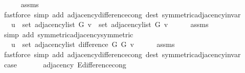 \begin{isabellebody}
\ \ \ \ \isamarkupfalse%
\ assms\isanewline
\ \ \ \ \isamarkupfalse%
\ {\isacharparenleft}{\kern0pt}fastforce\ simp\ add{\isacharcolon}{\kern0pt}\ adjacency{\isacharunderscore}{\kern0pt}difference{\isacharunderscore}{\kern0pt}cong\ dest{\isacharcolon}{\kern0pt}\ symmetric{\isacharunderscore}{\kern0pt}adjacency{\isachardot}{\kern0pt}invar{\isacharparenright}{\kern0pt}\isanewline
\ \ \isamarkupfalse%
\ \isamarkupfalse%
\ {\isachardoublequoteopen}{\isachardot}{\kern0pt}{\isachardot}{\kern0pt}{\isachardot}{\kern0pt}\ {\isasymlongleftrightarrow}\ u\ {\isasymin}\ set\ {\isacharparenleft}{\kern0pt}adjacency{\isacharunderscore}{\kern0pt}list\ G{}\ v{\isacharparenright}{\kern0pt}\ {\isacharminus}{\kern0pt}\ set\ {\isacharparenleft}{\kern0pt}adjacency{\isacharunderscore}{\kern0pt}list\ G{}\ v{\isacharparenright}{\kern0pt}{\isachardoublequoteclose}\isanewline
\ \ \ \ \isamarkupfalse%
\ assms\isanewline
\ \ \ \ \isamarkupfalse%
\ {\isacharparenleft}{\kern0pt}simp\ add{\isacharcolon}{\kern0pt}\ symmetric{\isacharunderscore}{\kern0pt}adjacency{\isachardot}{\kern0pt}symmetric{\isacharparenright}{\kern0pt}\isanewline
\ \ \isamarkupfalse%
\ \isamarkupfalse%
\ {\isachardoublequoteopen}{\isachardot}{\kern0pt}{\isachardot}{\kern0pt}{\isachardot}{\kern0pt}\ {\isasymlongleftrightarrow}\ u\ {\isasymin}\ set\ {\isacharparenleft}{\kern0pt}adjacency{\isacharunderscore}{\kern0pt}list\ {\isacharparenleft}{\kern0pt}difference\ G{}\ G{}{\isacharparenright}{\kern0pt}\ v{\isacharparenright}{\kern0pt}{\isachardoublequoteclose}\isanewline
\ \ \ \ \isamarkupfalse%
\ assms\isanewline
\ \ \ \ \isamarkupfalse%
\ {\isacharparenleft}{\kern0pt}fastforce\ simp\ add{\isacharcolon}{\kern0pt}\ adjacency{\isacharunderscore}{\kern0pt}difference{\isacharunderscore}{\kern0pt}cong\ dest{\isacharcolon}{\kern0pt}\ symmetric{\isacharunderscore}{\kern0pt}adjacency{\isachardot}{\kern0pt}invar{\isacharparenright}{\kern0pt}\isanewline
\ \ \isamarkupfalse%
\ \isamarkupfalse%
\ {\isacharquery}{\kern0pt}case\isanewline
\ \ \ \ \isacommand{{\isachardot}{\kern0pt}}\isamarkupfalse%
\isanewline
{}\isamarkupfalse%
%
\endisatagproof
{\isafoldproof}%
%
\isadelimproof
\isanewline
%
\endisadelimproof
\isanewline
{}\isamarkupfalse%
\ {\isacharparenleft}{\kern0pt}\ adjacency{\isacharparenright}{\kern0pt}\ E{\isacharunderscore}{\kern0pt}difference{\isacharunderscore}{\kern0pt}cong{\isacharcolon}{\kern0pt}\isanewline

\end{isabellebody}
